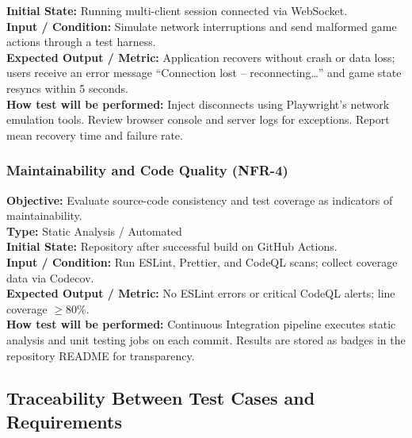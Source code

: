 \documentclass[12pt, titlepage]{article}
\begin{document}
    \textbf{Initial State:} Running multi-client session connected via WebSocket. \\

    \textbf{Input / Condition:} Simulate network interruptions and send malformed game actions through a test harness. \\

    \textbf{Expected Output / Metric:} Application recovers without crash or data loss; users receive an error message ``Connection lost – reconnecting…'' and game state resyncs within 5 seconds. \\

    \textbf{How test will be performed:}
    Inject disconnects using Playwright’s network emulation tools. Review browser console and server logs for exceptions. Report mean recovery time and failure rate.

    \subsubsection{Maintainability and Code Quality (NFR-4)}
    \textbf{Objective:} Evaluate source-code consistency and test coverage as indicators of maintainability. \\

    \textbf{Type:} Static Analysis / Automated \\

    \textbf{Initial State:} Repository after successful build on GitHub Actions. \\

    \textbf{Input / Condition:} Run ESLint, Prettier, and CodeQL scans; collect coverage data via Codecov. \\

    \textbf{Expected Output / Metric:} No ESLint errors or critical CodeQL alerts; line coverage $\geq 80$\%. \\

    \textbf{How test will be performed:}
    Continuous Integration pipeline executes static analysis and unit testing jobs on each commit. Results are stored as badges in the repository README for transparency.



\subsection{Traceability Between Test Cases and Requirements}

\end{document}

